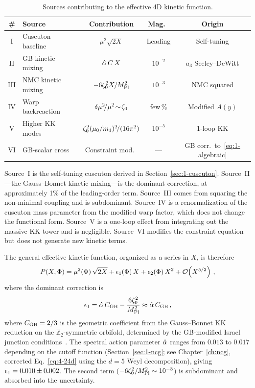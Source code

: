 \begin{table}[h]
\centering
\caption{Sources contributing to the effective 4D kinetic function.}
\label{tab:1-kk-sources}
\small
\begin{tabular}{@{}clccc@{}}
\toprule
\# & Source & Contribution & Mag.\ & Origin \\
\midrule
I & Cuscuton baseline & $\mu^2\!\sqrt{2X}$ & Leading & Self-tuning \\
II & GB kinetic mixing & $\hat{\alpha}\, C\, X$ & $10^{-2}$ & $a_3$ Seeley--DeWitt \\
III & NMC kinetic mixing & $-6\zeta_0^2 X/M_{\mathrm{Pl}}^2$ & $10^{-3}$ & NMC squared \\
IV & Warp backreaction & $\delta\mu^2\!/\mu^2\!\sim\!\zeta_0$ & few\,\% & Modified $A(y)$ \\
V & Higher KK modes & $\zeta_0^2(\mu_0/m_1)^2\!/(16\pi^2)$ & $10^{-5}$ & 1-loop KK \\
VI & GB-scalar cross & Constraint mod.\ & --- & GB corr.\ to~\eqref{eq:1-algebraic} \\
\bottomrule
\end{tabular}
\end{table}

Source~I is the self-tuning cuscuton derived in Section~\ref{sec:1-cuscuton}. Source~II---the Gauss--Bonnet kinetic mixing---is the dominant correction, at approximately 1\% of the leading-order term. Source~III comes from squaring the non-minimal coupling and is subdominant. Source~IV is a renormalization of the cuscuton mass parameter from the modified warp factor, which does not change the functional form. Source~V is a one-loop effect from integrating out the massive KK tower and is negligible. Source~VI modifies the constraint equation but does not generate new kinetic terms.

The general effective kinetic function, organized as a series in $X$, is therefore
\begin{equation}
\label{eq:1-corrected-P}
P(X, \Phi) = \mu^2(\Phi)\,\sqrt{2X} + \epsilon_1(\Phi)\, X + \epsilon_2(\Phi)\, X^2 + \mathcal{O}\!\left(X^{5/2}\right)\,,
\end{equation}
where the dominant correction is
\begin{equation}
\label{eq:1-eps1}
\epsilon_1 = \hat{\alpha}\, C_{\mathrm{GB}} - \frac{6\zeta_0^2}{M_{\mathrm{Pl}}^2} \approx \hat{\alpha}\, C_{\mathrm{GB}}\,,
\end{equation}
where $C_{\mathrm{GB}} = 2/3$ is the geometric coefficient from the Gauss--Bonnet KK reduction on the $\mathbb{Z}_2$-symmetric orbifold, determined by the GB-modified Israel junction conditions~\cite{ch1:davis03}. The spectral action parameter $\hat{\alpha}$ ranges from $0.013$ to $0.017$ depending on the cutoff function (Section~\ref{sec:1-ncg}; see Chapter~\ref{ch:ncg}, corrected Eq.~\eqref{eq:4-24d} using the $d = 5$ Weyl decomposition), giving $\epsilon_1 = 0.010 \pm 0.002$. The second term ($-6\zeta_0^2/M_{\mathrm{Pl}}^2 \sim 10^{-3}$) is subdominant and absorbed into the uncertainty.


